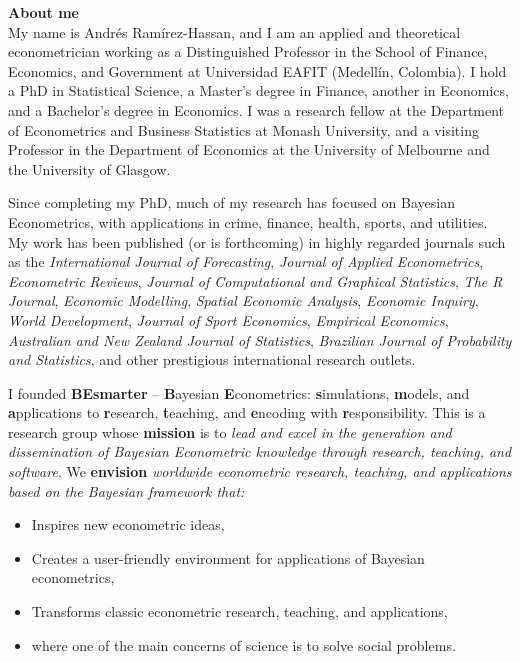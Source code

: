\textbf{About me}\\
My name is Andrés Ramírez-Hassan, and I am an applied and theoretical econometrician working as a Distinguished Professor in the School of Finance, Economics, and Government at Universidad EAFIT (Medellín, Colombia). I hold a PhD in Statistical Science, a Master's degree in Finance, another in Economics, and a Bachelor's degree in Economics. I was a research fellow at the Department of Econometrics and Business Statistics at Monash University, and a visiting Professor in the Department of Economics at the University of Melbourne and the University of Glasgow. 

Since completing my PhD, much of my research has focused on Bayesian Econometrics, with applications in crime, finance, health, sports, and utilities. My work has been published (or is forthcoming) in highly regarded journals such as the \textit{International Journal of Forecasting}, \textit{Journal of Applied Econometrics}, \textit{Econometric Reviews}, \textit{Journal of Computational and Graphical Statistics}, \textit{The R Journal}, \textit{Economic Modelling}, \textit{Spatial Economic Analysis}, \textit{Economic Inquiry}, \textit{World Development}, \textit{Journal of Sport Economics}, \textit{Empirical Economics}, \textit{Australian and New Zealand Journal of Statistics}, \textit{Brazilian Journal of Probability and Statistics}, and other prestigious international research outlets.

I founded \textbf{BEsmarter} -- \textbf{B}ayesian \textbf{E}conometrics: \textbf{s}imulations, \textbf{m}odels, and \textbf{a}pplications to \textbf{r}esearch, \textbf{t}eaching, and \textbf{e}ncoding with \textbf{r}esponsibility. This is a research group whose \textbf{mission} is to \textit{lead and excel in the generation and dissemination of Bayesian Econometric knowledge through research, teaching, and software}. We \textbf{envision} \textit{worldwide econometric research, teaching, and applications based on the Bayesian framework that:}

\begin{itemize}
	\item Inspires new econometric ideas,
	\item Creates a user-friendly environment for applications of Bayesian econometrics,
	\item Transforms classic econometric research, teaching, and applications, 
	\item where one of the main concerns of science is to solve social problems.  
\end{itemize}

